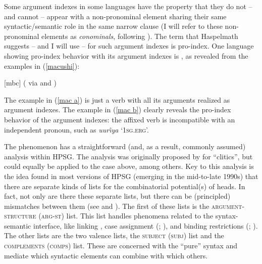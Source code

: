 \documentclass[output=paper,biblatex,babelshorthands,newtxmath,draftmode,colorlinks,citecolor=brown]{langscibook}
\begin{document}
\largerpage[-1]
Some argument indexes in some languages have the property that they do not -- and cannot -- appear
with a non-pronominal element sharing their same syntactic/semantic role in the same narrow clause
(I will refer to these non-pronominal elements as \emph{conominals}, following \citealt[]{haspelmath13}). The term that Haspelmath suggests -- and I will use -- for such argument indexes is pro-index. One language showing pro-index behavior with its argument indexes is , as revealed from the examples in (\ref{macushi}): 
%
\begin{samepage}
\begin{exe}
\ex \label{macushi}  [mbc] (\citealt[]{abbott91} via \citealt[]{siewierska99} and \citealt[]{corbett03}) \nolistbreak
\begin{xlist}
\end{xlist}
\end{exe}
\end{samepage}
The example in (\ref{mac a}) is just a verb with all its arguments realized as argument indexes. The example in (\ref{mac b}) clearly reveals the pro-index behavior of the argument indexes: the affixed verb is incompatible with an independent pronoun, such as \textit{uur\^{\i}ya} `\textsc{1sg.erg}'. 

\largerpage[-1]
The  phenomenon has a straightforward (and, as a result, commonly assumed) analysis within HPSG. The analysis was originally proposed by \citet{MS97a-u} for  ``clitics'', but could equally be applied to the  case above, among others. Key to this analysis is the idea found in most versions of HPSG (emerging in the mid-to-late 1990s) that there are separate kinds of lists for the combinatorial potential(s) of heads. In fact, not only are there these separate lists, but there can be (principled) mismatches between them (see  and ). The first of these lists is the \textsc{argument-structure} (\textsc{arg-st}) list. This list handles phenomena related to the syntax-semantic interface, like linking \citep{Davis2001a-u}, case assignment (\citealt{Meurers99b,Prze99b}; ), and binding restrictions (\citealt{mannsag98,wecharka98}; ). The other lists are the two valence lists, the \textsc{subject} (\textsc{subj}) list and the \textsc{complements} (\textsc{comps}) list. These are concerned with the ``pure'' syntax and mediate which syntactic elements can combine with which others.
\end{document}
